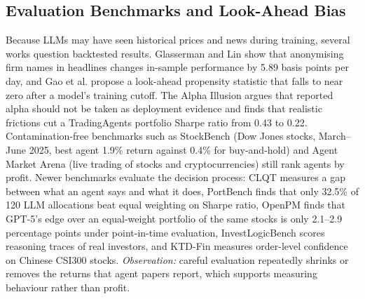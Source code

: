 \subsection{Evaluation Benchmarks and Look-Ahead Bias}
Because LLMs may have seen historical prices and news during training, several works question backtested results. Glasserman and Lin \cite{glasserman2024lookahead} show that anonymising firm names in headlines changes in-sample performance by 5.89 basis points per day, and Gao et al. \cite{gao2025lookahead} propose a look-ahead propensity statistic that falls to near zero after a model's training cutoff. The Alpha Illusion \cite{alphaillusion} argues that reported alpha should not be taken as deployment evidence and finds that realistic frictions cut a TradingAgents portfolio Sharpe ratio from 0.43 to 0.22. Contamination-free benchmarks such as StockBench \cite{stockbench} (Dow Jones stocks, March--June 2025, best agent 1.9\% return against 0.4\% for buy-and-hold) and Agent Market Arena \cite{agentmarketarena} (live trading of stocks and cryptocurrencies) still rank agents by profit. Newer benchmarks evaluate the decision process: CLQT \cite{clqt} measures a gap between what an agent says and what it does, PortBench \cite{portbench} finds that only 32.5\% of 120 LLM allocations beat equal weighting on Sharpe ratio, OpenPM \cite{openpm} finds that GPT-5's edge over an equal-weight portfolio of the same stocks is only 2.1--2.9 percentage points under point-in-time evaluation, InvestLogicBench \cite{investlogicbench} scores reasoning traces of real investors, and KTD-Fin \cite{ktdfin} measures order-level confidence on Chinese CSI300 stocks. \emph{Observation:} careful evaluation repeatedly shrinks or removes the returns that agent papers report, which supports measuring behaviour rather than profit.

